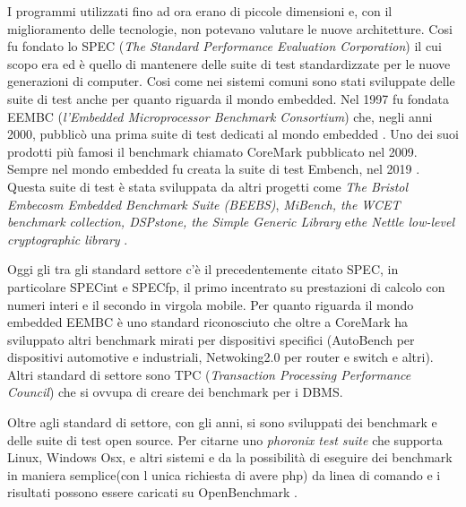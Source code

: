 \documentclass[12pt, a4paper]{report}
\begin{document}
 I programmi utilizzati fino ad ora erano di piccole dimensioni e, con il miglioramento delle tecnologie, non potevano valutare le nuove architetture. Cosi fu fondato lo SPEC (\textit{The Standard Performance Evaluation Corporation}) il cui scopo era ed è quello di mantenere delle suite di test standardizzate per le nuove generazioni di computer. 
 Cosi come nei sistemi comuni sono stati sviluppate delle suite di test anche per quanto riguarda il mondo embedded. Nel 1997 fu fondata EEMBC (\textit{l'Embedded Microprocessor Benchmark Consortium}) che, negli anni 2000, pubblicò una prima suite di test dedicati al mondo embedded \cite{EEMBCSite}. %
 Uno dei suoi prodotti più famosi il benchmark chiamato CoreMark pubblicato nel 2009. %
 Sempre nel mondo embedded fu creata la suite di test Embench, nel 2019 \cite{embenchSite}. Questa suite di test è stata sviluppata da altri progetti come \textit{The Bristol Embecosm Embedded Benchmark Suite (BEEBS)}, \textit{MiBench, the WCET benchmark collection, DSPstone, the Simple Generic Library} e\textit{the Nettle low-level cryptographic library}\cite{NettleSite}\cite{vittekBorovanskyMoreauTurin2006, }\cite{DSPStoneSite} \cite{WCETSite} \cite{MiBenchSite}. %
 
 Oggi gli tra gli standard settore c'è il precedentemente citato SPEC, in particolare SPECint e SPECfp, il primo incentrato su prestazioni di calcolo con numeri interi e il secondo in virgola mobile. 
 Per quanto riguarda il mondo embedded EEMBC è uno standard riconosciuto che oltre a CoreMark ha sviluppato altri benchmark mirati per dispositivi specifici (AutoBench per dispositivi automotive e industriali, Netwoking2.0 per router e switch e altri). %
 Altri standard di settore sono TPC (\textit{Transaction Processing Performance Council}) che si ovvupa di creare dei benchmark per i DBMS\cite{TPCSite}. %

 Oltre agli standard di settore, con gli anni, si sono sviluppati dei benchmark e delle suite di test open source. Per citarne uno \textit{phoronix test suite} \cite{ PhoronixTestSuiteSite}
 che supporta Linux, Windows Osx, e altri sistemi e da la possibilità di eseguire dei benchmark in maniera semplice(con l unica richiesta di avere php) da linea di comando e i risultati possono essere caricati su OpenBenchmark \cite{OpenBenchmarkSite}.
\end{document}
